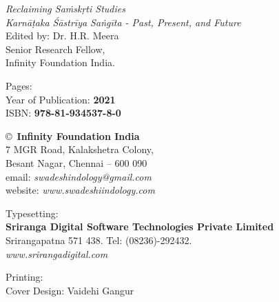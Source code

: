 \thispagestyle{empty}

\noindent
{\fontsize{9}{11}\selectfont\sl Reclaiming Saṁskṛti Studies}\\
\textit{Karnāṭaka Śāstrīya Saṅgīta - Past, Present, and Future}\\
Edited by: Dr. H.R. Meera\\
Senior Research Fellow,\\
Infinity Foundation India.
\vfill

\noindent
Pages: {\bf\pageref{bookend}}\\
Year of Publication: {\bf 2021}\\
ISBN: {\bf 978-81-934537-8-0}\\

\vfill

\noindent
\copyright\ {\bf Infinity Foundation India}\\ 
7 MGR Road, Kalakshetra Colony,\\ 
Besant Nagar, Chennai -- 600 090\\
email: {\sl swadeshindology@gmail.com}\\
website: {\sl www.swadeshiindology.com} 
\vfill

\noindent
Typesetting:\\ 
{\bf Sriranga Digital Software Technologies Private Limited}\\ 
Srirangapatna 571 438. Tel: (08236)-292432.\\
{\sl www.srirangadigital.com}
\vfill

\noindent
Printing:\\

\noindent
Cover Design: Vaidehi Gangur\\ 
